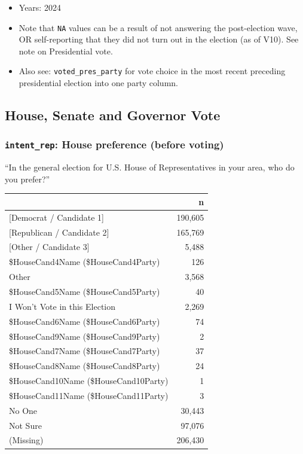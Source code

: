 \documentclass[10pt,article,oneside]{memoir}
\begin{document}
\begin{itemize}
\tightlist
\item
  Years: 2024
\item
  Note that \texttt{NA} values can be a result of not answering the
  post-election wave, OR self-reporting that they did not turn out in
  the election (as of V10). See note on Presidential vote.
\item
  Also see: \texttt{voted\_pres\_party} for vote choice in the most
  recent preceding presidential election into one party column.
\end{itemize}

\subsection{House, Senate and Governor
Vote}\label{house-senate-and-governor-vote}

\subsubsection{\texorpdfstring{\texttt{intent\_rep}: House preference
(before
voting)}{intent\_rep: House preference (before voting)}}\label{intent_rep-house-preference-before-voting}

``In the general election for U.S. House of Representatives in your
area, who do you prefer?''

\begin{table}[H]
\centering
\begin{tabular}[t]{lr}
\toprule
 & n\\
\midrule
{}{[Democrat / Candidate 1]} & 190,605\\
{}{[Republican / Candidate 2]} & 165,769\\
{}{[Other / Candidate 3]} & 5,488\\
\$HouseCand4Name (\$HouseCand4Party) & 126\\
Other & 3,568\\
\$HouseCand5Name (\$HouseCand5Party) & 40\\
I Won't Vote in this Election & 2,269\\
\$HouseCand6Name (\$HouseCand6Party) & 74\\
\$HouseCand9Name (\$HouseCand9Party) & 2\\
\$HouseCand7Name (\$HouseCand7Party) & 37\\
\$HouseCand8Name (\$HouseCand8Party) & 24\\
\$HouseCand10Name (\$HouseCand10Party) & 1\\
\$HouseCand11Name (\$HouseCand11Party) & 3\\
No One & 30,443\\
Not Sure & 97,076\\
(Missing) & 206,430\\
\bottomrule
\end{tabular}
\end{table}
\end{document}
